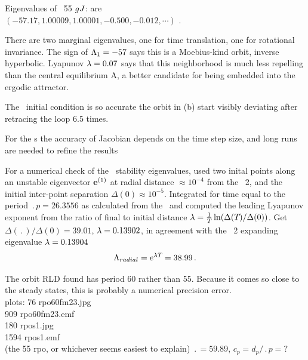 Eigenvalues of \rpo\ {\nameit}55 $g{J}$: are
\\
$(-57.17,  1.00009, 1.00001, -0.500, -0.012, \cdots)$ .
%

There are two
marginal eigenvalues, one for time translation, one for
rotational invariance. 
The sign of $\Lambda_{1}=-57$ says this is a Moebius-kind orbit,
inverse hyperbolic.
Lyapunov $\lambda=0.07$ says that this neighborhood is much less repelling than
the central equilibrium A, a better candidate for being embedded into the
ergodic attractor.

The \rpo\ initial condition is
so accurate the orbit in (b)
start visibly deviating after retracing the loop 6.5 times.

For the \rpo s the accuracy of Jacobian depends
on the time step size, and long runs are needed to refine the results

For a numerical check of the \rpo\ stability eigenvalues,
used two inital
points along an unstable eigenvector ${\bf e}^{(1)}$
at radial distance  $\approx 10^{-4}$ from the \eqv\ {\nameit}2,
and the initial inter-point separation $\Delta(0) \approx 10^{-5}$.
Integrated for time equal to the period $\period{p}=26.3556$ as calculated from
the \jacobianM\ and computed the leading Lyapunov exponent from the ratio of
final to initial distance 
$\lambda= {1 \over {T_{}}}\ln( \Delta({T_{}})/\Delta(0))$.
Get
$\Delta(\period{})/\Delta(0) =39.01$,
$\lambda=0.13902$, in agreement with the \eqv\ {\nameit}2 
expanding eigenvalue $\lambda=0.13904$
\[
\Lambda_{radial} =  e^{\lambda {T_{}}} =38.99
\,.
\]

The orbit RLD found has period 60 
rather than 55.  Because it comes so close to the steady states, 
this is probably a numerical precision error.
\\
plots:
  76 rpo60fm23.jpg	\\
 909 rpo60fm23.emf	\\
 180 rpos1.jpg	\\
1594 rpos1.emf	\\


(the 55 rpo, or whichever seems easiest to explain)
$\period{} = 59.89$,
$c_p = d_p/\period{p}= ?$

